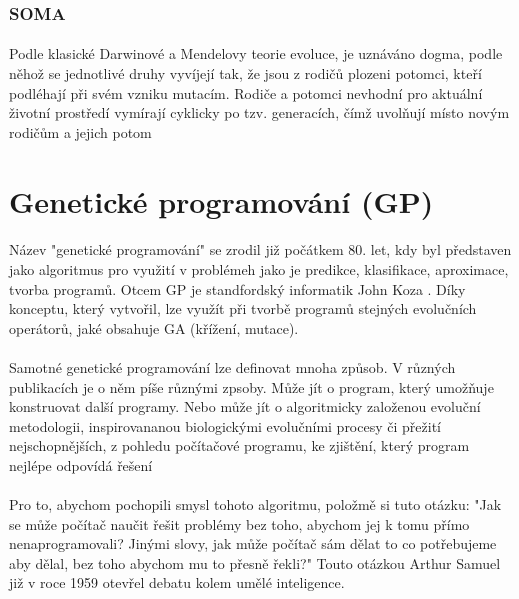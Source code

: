 \documentclass[bc,male,java,dept460]{diploma}		%
\begin{document}
\subsubsection{SOMA}
\paragraph*{}
Podle klasické Darwinové a Mendelovy teorie evoluce, je uznáváno dogma, podle něhož se jednotlivé druhy vyvíjejí tak, že jsou z rodičů plozeni potomci, kteří podléhají při svém vzniku mutacím. Rodiče a potomci nevhodní pro aktuální životní prostředí vymírají cyklicky po tzv. generacích, čímž uvolňují místo novým rodičům a jejich potom

\section{Genetické programování (GP)}
\paragraph*{}
Název "genetické programování" se zrodil již počátkem 80. let, kdy byl představen jako algoritmus pro využití v problémeh jako je predikce, klasifikace, aproximace, tvorba programů.
Otcem GP je standfordský informatik John Koza \cite{kozagp,kozagp2}. Díky konceptu, který vytvořil, lze využít při tvorbě programů stejných evolučních operátorů, jaké obsahuje GA (křížení, mutace).
\paragraph*{}
Samotné genetické programování lze definovat mnoha způsob. V různých publikacích je o něm píše různými zpsoby. Může jít o program, který umožňuje konstruovat další programy. Nebo může jít o algoritmicky založenou evoluční metodologii, inspirovananou biologickými evolučními procesy či přežití nejschopnějších, z pohledu počítačové programu, ke zjištění, který program nejlépe odpovídá řešení

\paragraph*{}
Pro to, abychom pochopili smysl tohoto algoritmu, položmě si tuto otázku: "Jak se může počítač naučit řešit  problémy bez toho, abychom jej k tomu přímo nenaprogramovali? Jinými slovy, jak může počítač sám dělat to co potřebujeme aby dělal, bez toho abychom mu to přesně řekli?" Touto otázkou Arthur Samuel již v roce 1959 otevřel debatu kolem umělé inteligence.
\end{document}
